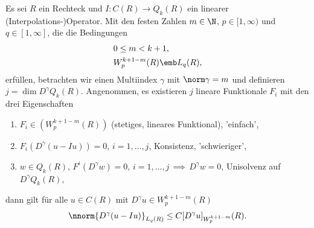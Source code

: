\begin{lemma}\label{lem:7-6}
  Es sei $R$ ein Rechteck und $I:C(R) \to Q_{k}(R)$ ein linearer (Interpolations-)Operator. Mit den festen Zahlen $m \in \N$, $p\in [1, \infty)$ und $q \in [1, \infty]$, die die Bedingungen 
  \begin{align*}
    &0 \leq m < k+1, \\
    &W_{p}^{k+1-m}(R) \emb L_{q}(R), 
  \end{align*}
erfüllen, betrachten wir einen Multiindex $\gamma$ mit $\norm\gamma = m$ und definieren $j = \dim D^{\gamma} Q_{k}(R)$. Angenommen, es existieren $j$ lineare Funktionale $F_{i}$ mit den drei Eigenschaften
\begin{enumerate}
\item $F_{i} \in (W_{p}^{k+1-m} (R))$ (stetiges, lineares Funktional), 'einfach', 
\item $F_{i}(D^{\gamma}(u- Iu)) = 0$, $i = 1, \dots, j$, Konsistenz, 'schwieriger', 
\item $w \in Q_{k}(R), \, F^{i}(D^{\gamma}w) = 0, \, i = 1, \dots, j \, \implies\, D^{\gamma}w = 0$, Unisolvenz auf $D^{\gamma}Q_{k}(R)$, 
\end{enumerate}
dann gilt für alle $u \in C(R)$ mit $D^{\gamma}u \in W_{p}^{k+1-m}(R)$
\begin{align*}
  \nnorm{D^{\gamma}(u-Iu)}_{ L_{q}(R)}\leq C [D^{\gamma}u]_{W_{p}^{k+1-m}}(R). 
\end{align*}
\end{lemma}

